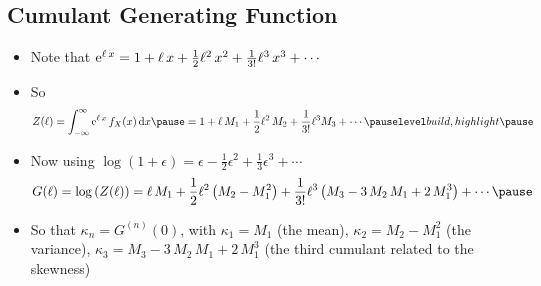 \begin{slide}
\section{Cumulant Generating Function}
  
\begin{PauseHighLight}
  \begin{itemize}
  \item Note that ${\rm e}^{\ell\,x} = 1 + \ell\,x + \tfrac{1}{2}
    \ell^2\,x^2 + \tfrac{1}{3!} \ell^3\,x^3 + \cdots$\pause
  \item So
    \begin{align*}
      Z(\ell) =  \int_{-\infty}^\infty \e{\ell \, x} \, f_X(x) \, \dd
      x\pause
      = 1 + \ell\, M_1 + \frac{1}{2} \ell^2\, M_2 +  \frac{1}{3!}
      \ell^3 M_3 + \cdots\pauseb
    \end{align*}
  \item Now using $\log(1+\epsilon) = \epsilon - \tfrac{1}{2}
    \epsilon^2 + \tfrac{1}{3} \epsilon^3 + \cdots$
    {\small
    \begin{align*}
      G(\ell) = \logg{Z(\ell)} = \ell\,M_1 +  \frac{1}{2}
      \ell^2\bra{M_2 - M_1^2} +  \frac{1}{3!}
      \ell^3 \bra{M_3 - 3\, M_2\,M_1 + 2\,M_1^3} + \cdots\pause
    \end{align*}}
  \item So that $\kappa_n=G^{(n)}(0)$, with $\kappa_1=M_1$ (the mean),
    $\kappa_2 = M_2-M_1^2$ (the variance), $\kappa_3 = M_3 - 3\,
    M_2\,M_1 + 2\,M_1^3$ (the third cumulant related to the skewness)\pause
  \end{itemize}
\end{PauseHighLight}

\end{slide}


